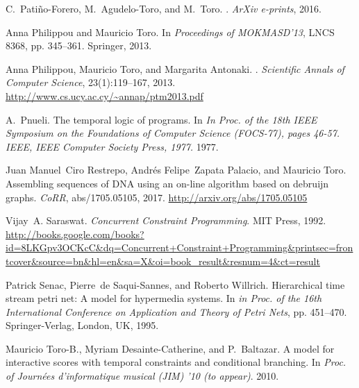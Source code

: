 \documentclass[]{lipics-iclp}
\theoremstyle{plain}\newtheorem{mainthm}[thm]{Main Theorem}
\theoremstyle{definition}\newtheorem{crucialdef}[thm]{Crucial Definition}
\begin{document}
\begin{thebibliography}{{Tor}16a}
C.~Pati{\~n}o-Forero, M.~Agudelo-Toro, and M.~Toro.
.
\newblock \emph{ArXiv e-prints}, 2016.

Anna Philippou and Mauricio Toro.
\newblock In \emph{{Proceedings of MOKMASD'13}}, {LNCS 8368}, pp. 345--361.
  Springer, 2013.

Anna Philippou, Mauricio Toro, and Margarita Antonaki.
.
\newblock \emph{Scientific Annals of Computer Science}, 23(1):119--167, 2013.
\newline\urlprefix\url{http://www.cs.ucy.ac.cy/~annap/ptm2013.pdf}

A.~Pnueli.
\newblock The temporal logic of programs.
\newblock In \emph{In Proc. of the 18th IEEE Symposium on the Foundations of
  Computer Science (FOCS-77), pages 46-57. IEEE, IEEE Computer Society Press,
  1977.} 1977.

Juan Manuel~Ciro Restrepo, Andr{\'{e}}s Felipe~Zapata Palacio, and Mauricio
  Toro.
\newblock Assembling sequences of {DNA} using an on-line algorithm based on
  debruijn graphs.
\newblock \emph{CoRR}, abs/1705.05105, 2017.
\newline\urlprefix\url{http://arxiv.org/abs/1705.05105}

Vijay~A. Saraswat.
\newblock \emph{Concurrent Constraint Programming}.
\newblock MIT Press, 1992.
\newline\urlprefix\url{http://books.google.com/books?id=8LKGpv3OCKcC&dq=Concurrent+Constraint+Programming&printsec=frontcover&source=bn&hl=en&sa=X&oi=book_result&resnum=4&ct=result}

Patrick Senac, Pierre~de Saqui-Sannes, and Roberto Willrich.
\newblock Hierarchical time stream petri net: A model for hypermedia systems.
\newblock In \emph{in Proc. of the 16th International Conference on Application
  and Theory of Petri Nets}, pp. 451--470. Springer-Verlag, London, UK, 1995.

Mauricio Toro-B., Myriam Desainte-Catherine, and P.~Baltazar.
\newblock A model for interactive scores with temporal constraints and
  conditional branching.
\newblock In \emph{Proc. of Journ{\'e}es d'informatique musical (JIM) '10 (to
  appear)}. 2010.


\end{thebibliography}
\end{document}
